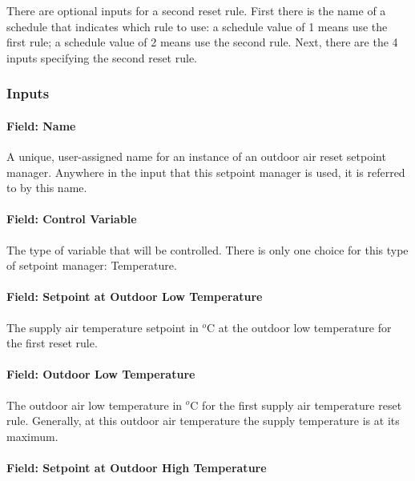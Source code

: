 There are optional inputs for a second reset rule. First there is the name of a schedule that indicates which rule to use: a schedule value of 1 means use the first rule; a schedule value of 2 means use the second rule. Next, there are the 4 inputs specifying the second reset rule.

\subsubsection{Inputs}\label{inputs-2-037}

\paragraph{Field: Name}\label{field-name-2-035}

A unique, user-assigned name for an instance of an outdoor air reset setpoint manager. Anywhere in the input that this setpoint manager is used, it is referred to by this name.

\paragraph{Field: Control Variable}\label{field-control-variable-2}

The type of variable that will be controlled. There is only one choice for this type of setpoint manager: Temperature.

\paragraph{Field: Setpoint at Outdoor Low Temperature}\label{field-setpoint-at-outdoor-low-temperature}

The supply air temperature setpoint in \(^{o}\)C at the outdoor low temperature for the first reset rule.

\paragraph{Field: Outdoor Low Temperature}\label{field-outdoor-low-temperature}

The outdoor air low temperature in \(^{o}\)C for the first supply air temperature reset rule. Generally, at this outdoor air temperature the supply temperature is at its maximum.

\paragraph{Field: Setpoint at Outdoor High Temperature}\label{field-setpoint-at-outdoor-high-temperature}

